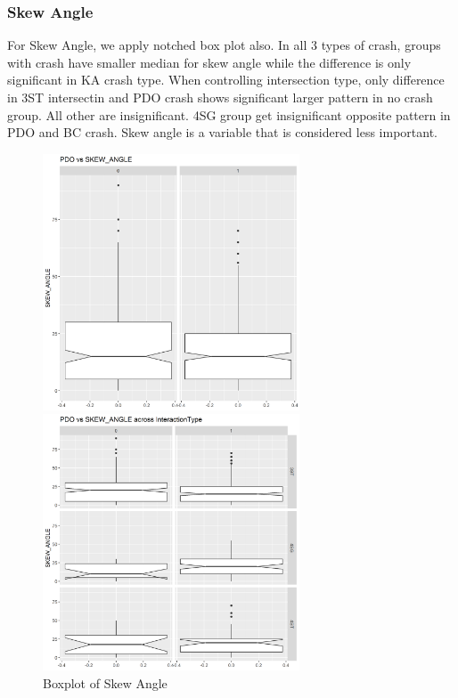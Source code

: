 \documentclass[11pt]{scrartcl} %
\begin{document}
\subsubsection{Skew Angle}

For Skew Angle, we apply notched box plot also. In all 3 types of crash, groups with crash have smaller median for skew angle while the difference is only significant in KA crash type. When controlling intersection type, only difference in 3ST intersectin and PDO crash shows significant larger pattern in no crash group. All other are insignificant. 4SG group get insignificant opposite pattern in PDO and BC crash. Skew angle is a variable that is considered less important.

\begin{figure}[H]
\begin{minipage}[t]{0.5\linewidth}
\centering
\includegraphics[width=3in]{image/angle_all_pdo.png}
\small
\end{minipage}
\begin{minipage}[t]{0.5\linewidth}
\centering
\includegraphics[width=3in]{image/angle_pdo.png}
\small
\end{minipage}
\caption{Boxplot of Skew Angle}
\end{figure}
\end{document}
